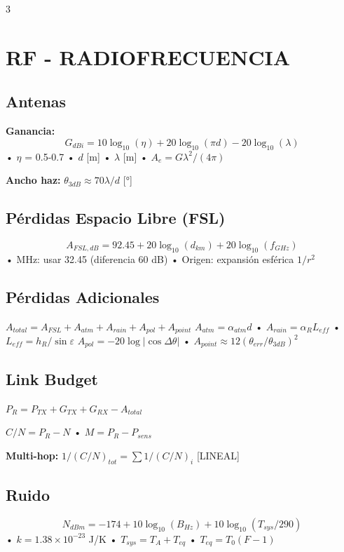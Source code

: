 \documentclass[a4paper,6pt]{extarticle}
\begin{document}
    \begin{multicols}{3}
    \footnotesize

    \section*{RF - RADIOFRECUENCIA}

\subsection*{Antenas}
\textbf{Ganancia:}
$$\boxed{G_{dBi} = 10\log_{10}(\eta) + 20\log_{10}(\pi d) - 20\log_{10}(\lambda)}$$
• $\eta$ = 0.5-0.7 • $d$ [m] • $\lambda$ [m] • $A_e = G\lambda^2/(4\pi)$

\textbf{Ancho haz:} $\boxed{\theta_{3dB} \approx 70\lambda/d}$ [°]

\subsection*{Pérdidas Espacio Libre (FSL)}
$$\boxed{A_{FSL,dB} = 92.45 + 20\log_{10}(d_{km}) + 20\log_{10}(f_{GHz})}$$
• MHz: usar 32.45 (diferencia 60 dB) • Origen: expansión esférica $1/r^2$

    \subsection*{Pérdidas Adicionales}
    $\boxed{A_{total} = A_{FSL} + A_{atm} + A_{rain} + A_{pol} + A_{point}}$
    $A_{atm} = \alpha_{atm}d$ • $A_{rain} = \alpha_R L_{eff}$ • $L_{eff} = h_R/\sin\varepsilon$
    $A_{pol} = -20\log|\cos\Delta\theta|$ • $A_{point} \approx 12(\theta_{err}/\theta_{3dB})^2$

    \subsection*{Link Budget}
    $\boxed{P_R = P_{TX} + G_{TX} + G_{RX} - A_{total}}$
    
    $C/N = P_R - N$ • $M = P_R - P_{sens}$
    
    \textbf{Multi-hop:} $\boxed{1/(C/N)_{tot} = \sum 1/(C/N)_i}$ [LINEAL]

\subsection*{Ruido}
$$\boxed{N_{dBm} = -174 + 10\log_{10}(B_{Hz}) + 10\log_{10}(T_{sys}/290)}$$
• $k = 1.38\times10^{-23}$ J/K • $T_{sys} = T_A + T_{eq}$ • $T_{eq} = T_0(F-1)$


\end{multicols}
\end{document}
